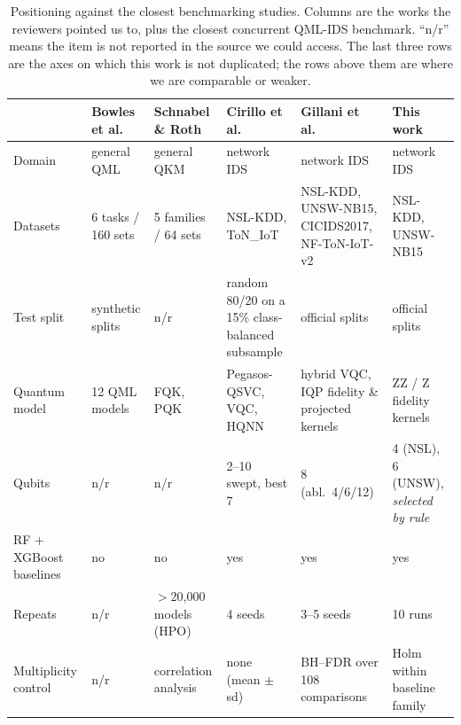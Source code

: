 \begin{table}[t]
\centering
\caption{Positioning against the closest benchmarking studies. Columns are the
works the reviewers pointed us to, plus the closest concurrent QML-IDS
benchmark. ``n/r'' means the item is not reported in the source we could
access. The last three rows are the axes on which this work is not duplicated;
the rows above them are where we are comparable or weaker.}
\label{tab:novelty}
\footnotesize
\setlength{\tabcolsep}{4pt}
\begin{tabular}{@{}l p{2.05cm} p{2.05cm} p{2.05cm} p{2.35cm} p{2.6cm}@{}}
\toprule
 & \textbf{Bowles et al.\ \cite{bowles2024}} & \textbf{Schnabel \& Roth \cite{schnabel2024}} & \textbf{Cirillo et al.\ \cite{qmi2026}} & \textbf{Gillani et al.\ \cite{gillani2026}} & \textbf{This work} \\
\midrule
Domain          & general QML        & general QKM        & network IDS        & network IDS        & network IDS \\
Datasets        & 6 tasks / 160 sets & 5 families / 64 sets & NSL-KDD, ToN\_IoT & NSL-KDD, UNSW-NB15, CICIDS2017, NF-ToN-IoT-v2 & NSL-KDD, UNSW-NB15 \\
Test split      & synthetic splits   & n/r                & random 80/20 on a 15\% class-balanced subsample & official splits    & official splits \\
Quantum model   & 12 QML models      & FQK, PQK           & Pegasos-QSVC, VQC, HQNN & hybrid VQC, IQP fidelity \& projected kernels & ZZ / Z fidelity kernels \\
Qubits          & n/r                & n/r                & 2--10 swept, best 7 & 8 (abl.\ 4/6/12)   & 4 (NSL), 6 (UNSW), \emph{selected by rule} \\
RF + XGBoost baselines & no          & no                 & yes                & yes                & yes \\
Repeats         & n/r                & $>$20{,}000 models (HPO) & 4 seeds      & 3--5 seeds         & 10 runs \\
Multiplicity control & n/r           & correlation analysis & none (mean $\pm$ sd) & BH--FDR over 108 comparisons & Holm within baseline family \\

\end{tabular}
\end{table}

